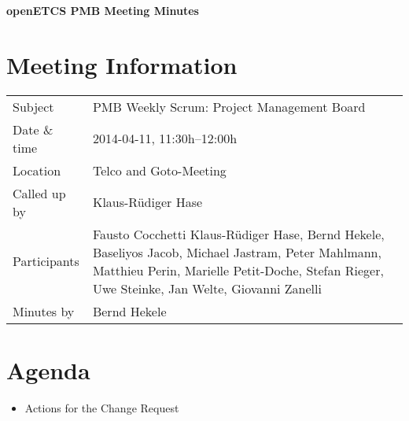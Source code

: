 \documentclass[a4paper, 11pt]{article}
\begin{document}
{\begin{center}\huge\bf openETCS PMB Meeting Minutes\end{center}}
\section{Meeting Information}

\renewcommand{\arraystretch}{1.5}
\begin{supertabular}{m{.2\textwidth}m{.8\textwidth}}
Subject & PMB Weekly Scrum: Project Management Board\\
Date \& time & 2014-04-11, 11:30h--12:00h\\
Location & Telco and Goto-Meeting\\
Called up by & Klaus-R\"udiger Hase\\
Participants &
Fausto Cocchetti
Klaus-R\"udiger Hase,
Bernd Hekele,
Baseliyos Jacob,
Michael Jastram,
Peter Mahlmann,
Matthieu Perin,
Marielle Petit-Doche,
Stefan Rieger,
Uwe Steinke,
Jan Welte,
Giovanni Zanelli
\\

Minutes by & Bernd Hekele\\

\end{supertabular}
\renewcommand{\arraystretch}{1.0}


\section{{Agenda}}

\begin{itemize}
\item Actions for the Change Request
\end{itemize}
\end{document}
